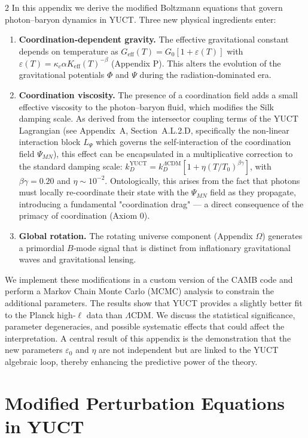 \documentclass[11pt,a4paper]{article}
\begin{document}
\begin{multicols}{2}
		In this appendix we derive the modified Boltzmann equations that govern photon--baryon dynamics in YUCT. Three new physical ingredients enter:
		\begin{enumerate}
			\item \textbf{Coordination‑dependent gravity.} The effective gravitational constant depends on temperature as $G_{\mathrm{eff}}(T) = G_0[1 + \varepsilon(T)]$ with $\varepsilon(T) = \kappa_c \alpha K_{\mathrm{eff}}(T)^{-\beta}$ (Appendix P). This alters the evolution of the gravitational potentials $\Phi$ and $\Psi$ during the radiation‑dominated era.
			\item \textbf{Coordination viscosity.} The presence of a coordination field adds a small effective viscosity to the photon--baryon fluid, which modifies the Silk damping scale. As derived from the intersector coupling terms of the YUCT Lagrangian (see Appendix~A, Section~A.L.2.D, specifically the non‑linear interaction block \(L_{\Psi}\) which governs the self‑interaction of the coordination field \(\Psi_{MN}\)), this effect can be encapsulated in a multiplicative correction to the standard damping scale: $k_D^{\text{YUCT}} = k_D^{\Lambda\text{CDM}} [1 + \eta (T/T_0)^{\beta\gamma}]$, with $\beta\gamma = 0.20$ and $\eta \sim 10^{-2}$. Ontologically, this arises from the fact that photons must locally re-coordinate their state with the $\Psi_{MN}$ field as they propagate, introducing a fundamental "coordination drag" — a direct consequence of the primacy of coordination (Axiom 0).
			\item \textbf{Global rotation.} The rotating universe component (Appendix $\Omega$) generates a primordial $B$‑mode signal that is distinct from inflationary gravitational waves and gravitational lensing.
		\end{enumerate}
		
		We implement these modifications in a custom version of the CAMB code and perform a Markov Chain Monte Carlo (MCMC) analysis to constrain the additional parameters. The results show that YUCT provides a slightly better fit to the Planck high‑$\ell$ data than $\Lambda$CDM. We discuss the statistical significance, parameter degeneracies, and possible systematic effects that could affect the interpretation. A central result of this appendix is the demonstration that the new parameters $\varepsilon_0$ and $\eta$ are not independent but are linked to the YUCT algebraic loop, thereby enhancing the predictive power of the theory.
		
		\section{Modified Perturbation Equations in YUCT}
		

\end{multicols}
\end{document}
